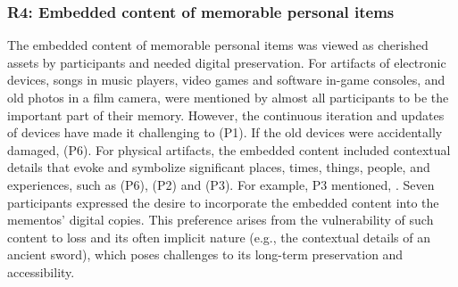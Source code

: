\subsubsection{R4: Embedded content of memorable personal items}
The embedded content of memorable personal items was viewed as cherished assets by participants and needed digital preservation. 
For artifacts of electronic devices, songs in music players, video games and software in-game consoles, and old photos in a film camera, were mentioned by almost all participants to be the important part of their memory. 
However, the continuous iteration and updates of devices have made it challenging to  (P1). 
If the old devices were accidentally damaged,  (P6). 
For physical artifacts, the embedded content included contextual details that evoke and symbolize significant places, times, things, people, and experiences, such as  (P6),  (P2) and  (P3). 
For example, P3 mentioned, . 
Seven participants expressed the desire to incorporate the embedded content into the mementos' digital copies.
This preference arises from the vulnerability of such content to loss and its often implicit nature (e.g., the contextual details of an ancient sword), which poses challenges to its long-term preservation and accessibility.

